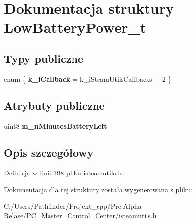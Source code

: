 \hypertarget{struct_low_battery_power__t}{}\section{Dokumentacja struktury Low\+Battery\+Power\+\_\+t}
\label{struct_low_battery_power__t}
\subsection*{Typy publiczne}
\begin{DoxyCompactItemize}
\item 
\mbox{\label{struct_low_battery_power__t_a84332671b98210c2f885ea1f4ee82668}} 
enum \{ {\bfseries k\+\_\+i\+Callback} = k\+\_\+i\+Steam\+Utils\+Callbacks + 2
 \}
\end{DoxyCompactItemize}
\subsection*{Atrybuty publiczne}
\begin{DoxyCompactItemize}
\item 
\mbox{\label{struct_low_battery_power__t_a34c3d138bbcf9387f837e89aea70b69b}} 
uint8 {\bfseries m\+\_\+n\+Minutes\+Battery\+Left}
\end{DoxyCompactItemize}


\subsection{Opis szczegółowy}


Definicja w linii 198 pliku isteamutils.\+h.



Dokumentacja dla tej struktury została wygenerowana z pliku\+:\begin{DoxyCompactItemize}
\item 
C\+:/\+Users/\+Pathfinder/\+Projekt\+\_\+cpp/\+Pre-\/\+Alpha Relase/\+P\+C\+\_\+\+Master\+\_\+\+Control\+\_\+\+Center/isteamutils.\+h\end{DoxyCompactItemize}
